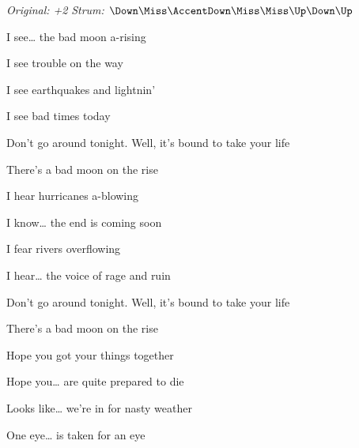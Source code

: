 \begin{song}


\begin{headerbox}
\RaiseBoxWithAccents
\textit{Original: +2} \quad
\textit{Strum:} $\Down\Miss\AccentDown\Miss\Miss\Up\Down\Up$
\end{headerbox}

\begin{hchordbox}
\end{hchordbox}

\Large

\bigskip

I see… the bad moon a-rising \par
{}I see trouble on the way \par
{}I see earthquakes and lightnin’ \par
{}I see bad times today \par

\bigskip

Don’t go around tonight. Well, it’s bound to take your life \par
{}There’s a bad moon on the rise \par

\bigskip

I hear hurricanes a-blowing \par
{}I know… the end is coming soon \par
{}I fear rivers overflowing \par
{}I hear… the voice of rage and ruin \par

\bigskip

Don’t go around tonight. Well, it’s bound to take your life \par
{}There’s a bad moon on the rise \par

\bigskip

Hope you got your things together \par
{}Hope you… are quite prepared to die \par
{}Looks like… we’re in for nasty weather \par
{}One eye… is taken for an eye \par


\end{song}

